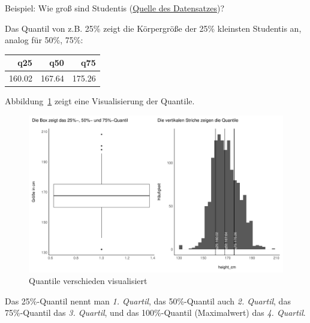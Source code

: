 \documentclass[
  a4paper,
  DIV=11]{scrreprt}
\theoremstyle{definition}
\theoremstyle{remark}
\begin{document}
Beispiel: Wie groß sind Studentis
(\href{https://rdrr.io/cran/openintro/man/speed_gender_height.html}{Quelle
des Datensatzes})?

Das Quantil von z.B. 25\% zeigt die Körpergröße der 25\% kleinsten
Studentis an, analog für 50\%, 75\%:

\begin{longtable}{rrr}
\toprule
q25 & q50 & q75 \\ 
\midrule
160.02 & 167.64 & 175.26 \\ 
\bottomrule
\end{longtable}

Abbildung~\ref{fig-quantiles} zeigt eine Visualisierung der Quantile.

\begin{figure}

{\centering \includegraphics{./Verteilungen_files/figure-pdf/fig-quantiles-1.pdf}

}

\caption{\label{fig-quantiles}Quantile verschieden visualisiert}

\end{figure}

\begin{tcolorbox}[enhanced jigsaw, title=\textcolor{quarto-callout-note-color}{\faInfo}\hspace{0.5em}{Hinweis}, bottomtitle=1mm, bottomrule=.15mm, titlerule=0mm, colbacktitle=quarto-callout-note-color!10!white, colframe=quarto-callout-note-color-frame, leftrule=.75mm, left=2mm, toprule=.15mm, colback=white, arc=.35mm, breakable, toptitle=1mm, opacityback=0, rightrule=.15mm, coltitle=black, opacitybacktitle=0.6]

Das 25\%-Quantil nennt man \emph{1. Quartil}, das 50\%-Quantil auch
\emph{2. Quartil}, das 75\%-Quantil das \emph{3. Quartil}, und das
100\%-Quantil (Maximalwert) das \emph{4. Quartil}.

\end{tcolorbox}
\end{document}
